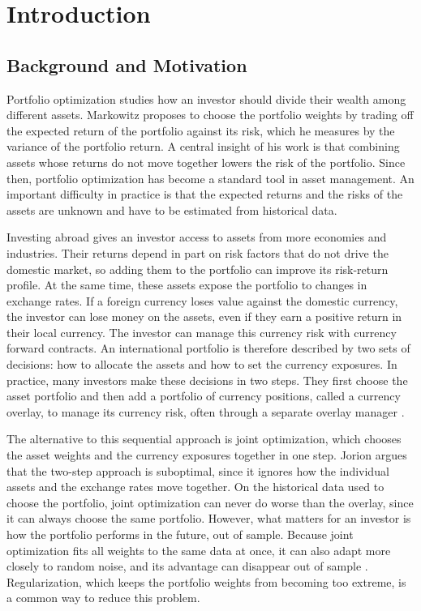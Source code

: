 
\chapter{Introduction}\label{ch:introduction}

\section{Background and Motivation}
 
Portfolio optimization studies how an investor should divide their wealth among different assets. Markowitz
\cite{Markowitz1952} proposes to choose the portfolio weights by trading off the expected return of the portfolio
against its risk, which he measures by the variance of the portfolio return. A central insight of his work is that
combining assets whose returns do not move together lowers the risk of the portfolio. Since then, portfolio
optimization has become a standard tool in asset management. An important difficulty in practice is that the expected
returns and the risks of the assets are unknown and have to be estimated from historical data.

Investing abroad gives an investor access to assets from more economies and industries. Their returns depend in part
on risk factors that do not drive the domestic market, so adding them to the portfolio can improve its risk-return
profile. At the same time, these assets expose the portfolio to changes in exchange rates. If a foreign currency loses
value against the domestic currency, the investor can lose money on the assets, even if they earn a
positive return in their local currency. The investor can manage this currency risk with currency forward contracts.
An international portfolio is therefore described by two sets of decisions: how to allocate the assets and how to set
the currency exposures. In practice, many investors make these decisions in two steps. They first choose the asset
portfolio and then add a portfolio of currency positions, called a currency overlay, to manage its currency risk, often
through a separate overlay manager \cite{SparseAndStableInternationalPortfolioOptimization}.

The alternative to this sequential approach is joint optimization, which chooses the asset weights and the currency
exposures together in one step. Jorion \cite{Jorion1994} argues that the two-step approach is suboptimal, since it
ignores how the individual assets and the exchange rates move together. On the historical data used to choose the
portfolio, joint optimization can never do worse than the overlay, since it can always choose the
same portfolio. However, what matters for an investor is how the portfolio performs in the future, out of sample.
Because joint optimization fits all weights to the same data at once, it can also adapt more closely to random noise, 
and its advantage can disappear out of sample \cite{SparseAndStableInternationalPortfolioOptimization}.
Regularization, which keeps the portfolio weights from becoming too extreme, is a common way to reduce this problem.

